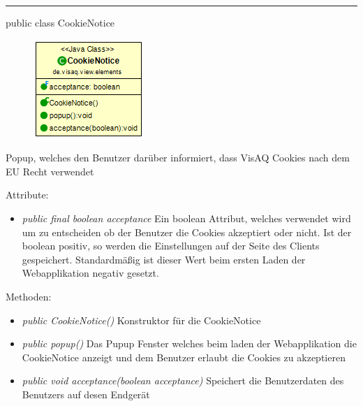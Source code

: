 
\rule{\textwidth}{0.4pt} 
public class CookieNotice

\begin{minipage}{0.3\textwidth}
    \begin{figure}[H]
        \includegraphics[scale = 0.6]{media/frontend/view/de.view.elements/CookieNotice_Class.png}
    \end{figure}
    \end{minipage} \hfill
    \begin{minipage}{0.6\textwidth}
Popup, welches den Benutzer darüber informiert, dass VisAQ Cookies nach dem EU Recht verwendet
\end{minipage}

Attribute:
\begin{itemize} 
    \item \emph{public final boolean acceptance} Ein boolean Attribut, welches verwendet wird um zu entscheiden ob der Benutzer die Cookies akzeptiert oder nicht. Ist der boolean positiv, so werden die Einstellungen auf der Seite des Clients gespeichert. Standardmäßig ist dieser Wert beim ersten Laden der Webapplikation negativ gesetzt.
\end{itemize}
Methoden:
\begin{itemize} 
    \item \emph{public CookieNotice()} Konstruktor für die CookieNotice 
    \item \emph{public popup()} Das Pupup Fenster welches beim laden der Webapplikation die CookieNotice anzeigt und dem Benutzer erlaubt die Cookies zu akzeptieren
    \item \emph{public void acceptance(boolean acceptance)} Speichert die Benutzerdaten des Benutzers auf desen Endgerät
\end{itemize}
